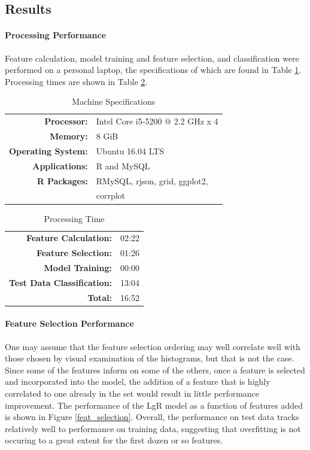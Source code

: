 \documentclass[fleqn,10pt]{SelfArx} %
\begin{document}
\subsection{Results}

\paragraph{Processing Performance}
Feature calculation, model training and feature selection, and classification were performed on a personal laptop, the specifications of which are found in Table \ref{machine-specs}.  Processing times are shown in Table \ref{proc-time}.

\begin{table}[H]
	\centering
	\caption{Machine Specifications}\label{machine-specs}
	\begin{tabular}{r l}
		\toprule
		\textbf{Processor:} 		& Intel Core i5-5200 @ 2.2 GHz x 4 \\
		\textbf{Memory:}			& 8 GiB \\
		\textbf{Operating System:}	& Ubuntu 16.04 LTS \\
		\textbf{Applications:}		& R and MySQL \\
		\textbf{R Packages:}		& RMySQL, rjson, grid, ggplot2, \\
									& corrplot
	\end{tabular}
\end{table}

\begin{table}[H]
	\centering
	\caption{Processing Time}\label{proc-time}
	\begin{tabular}{r l}
		\toprule
		\textbf{Feature Calculation:} 		& 02:22 \\
		\textbf{Feature Selection:}			& 01:26 \\
		\textbf{Model Training:}			& 00:00  \\
		\textbf{Test Data Classification:}	& 13:04 \\
		\textbf{Total:}						& 16:52
	\end{tabular}
\end{table}



\paragraph{Feature Selection Performance}
One may assume that the feature selection ordering may well correlate well with those chosen by visual examination of the histograms, but that is not the case.  Since some of the features inform on some of the others, once a feature is selected and incorporated into the model, the addition of a feature that is highly correlated to one already in the set would result in little performance improvement.  The performance of the LgR model as a function of features added is shown in Figure \ref{feat_selection}.  Overall, the performance on test data tracks relatively well to performance on training data, suggesting that overfitting is not occuring to a great extent for the first dozen or so features.
\end{document}
